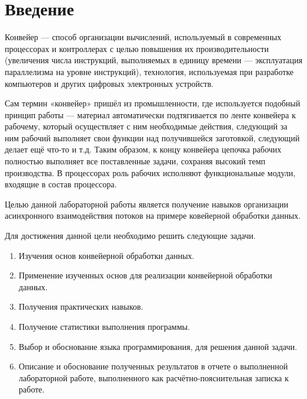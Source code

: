 \chapter*{Введение}
Конвейер — способ организации вычислений, используемый в современных процессорах и контроллерах с целью повышения их производительности (увеличения числа инструкций, выполняемых в единицу времени — эксплуатация параллелизма на уровне инструкций), технология, используемая при разработке компьютеров и других цифровых электронных устройств.

Сам термин «конвейер» пришёл из промышленности, где используется подобный принцип работы — материал автоматически подтягивается по ленте конвейера к рабочему, который осуществляет с ним необходимые действия, следующий за ним рабочий выполняет свои функции над получившейся заготовкой, следующий делает ещё что-то и т.д. Таким образом, к концу конвейера цепочка рабочих полностью выполняет все поставленные задачи, сохраняя высокий темп производства. В процессорах роль рабочих исполняют функциональные модули, входящие в состав процессора.


Целью данной лабораторной работы является получение навыков организации асинхронного взаимодействия потоков на примере ковейерной обработки данных.


Для достижения данной цели необходимо решить следующие задачи.


\begin{enumerate}
	\item Изучения основ конвейерной обработки данных.
	\item Применение изученных основ для реализации конвейерной обработки данных.
	\item Получения практических навыков.
	\item Получение статистики выполнения программы.
	\item Выбор и обоснование языка программирования, для решения данной задачи.
	\item Описание и обоснование полученных результатов в отчете о выполненной лабораторной работе, выполненного как расчётно-пояснительная записка к работе.
\end{enumerate}
